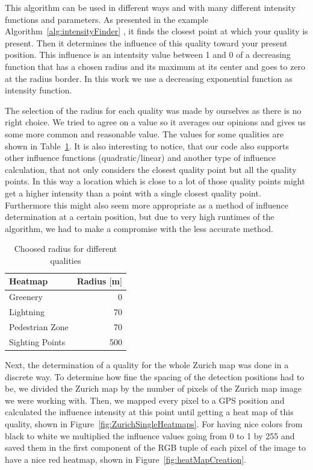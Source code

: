 \documentclass[letterpaper]{article}
\begin{document}
\indent This algorithm can be used in different ways and with many different intensity functions and parameters. As presented in the example Algorithm~\ref{alg:intensityFinder} , it finds the closest point at which your quality is present. Then it determines the influence of this quality toward your present position. This influence is an intentsity value between 1 and 0 of a decreasing function that has a chosen radius and its maximum at its center and goes to zero at the radius border. In this work we use a decreasing exponential function as intensity function.

\indent The selection of the radius for each quality was made by ourselves as there is no right choice. We tried to agree on a value so it averages our opinions and gives us some more common and reasonable value. The values for some qualities are shown in Table~\ref{table:RadiusParam}. It is also interesting to notice, that our code also supports other influence functions (quadratic/linear) and another type of influence calculation, that not only considers the closest quality point but all the quality points. In this way a location which is close to a lot of those quality points might get a higher intensity than a point with a single closest quality point. Furthermore this might also seem more appropriate as a method of influence determination at a certain position, but due to very high runtimes of the algorithm, we had to make a compromise with the less accurate method.

\begin{table}[htb]
    \centering
    \caption{Choosed radius for different qualities}
    \label{table:RadiusParam}
        \begin{tabular}{lr}
            Heatmap & Radius $[$m$]$\\\hline
            Greenery & 0\\
            Lightning & 70\\
            Pedestrian Zone & 70\\
            Sighting Points & 500\\
    \end{tabular}
\end{table}

\indent Next, the determination of a quality for the whole Zurich map was done in a discrete way. To determine how fine the spacing of the detection positions had to be, we divided the Zurich map by the number of pixels of the Zurich map image we were working with. Then, we mapped every pixel to a GPS position and calculated the influence intensity at this point until getting a heat map of this quality, shown in Figure~\ref{fig:ZurichSingleHeatmaps}. For having nice colors from black to white we multiplied the influence values going from 0 to 1 by 255 and saved them in the first component of the RGB tuple of each pixel of the image to have a nice red heatmap, shown in Figure~\ref{fig:heatMapCreation}.
\end{document}
